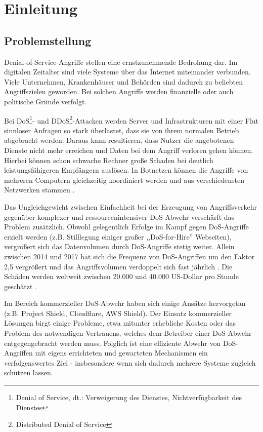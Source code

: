 \documentclass[../review_2.tex]{subfiles}
\begin{document}
    
    \chapter{Einleitung}\thispagestyle{fancy}
    
    \section{Problemstellung}
    Denial-of-Service-Angriffe stellen eine ernstzunehmende Bedrohung dar.
     Im digitalen Zeitalter sind viele Systeme über das Internet miteinander verbunden. Viele Unternehmen, Krankenhäuser und Behörden sind dadurch zu beliebten Angriffszielen geworden\cite{infopoint_security_cyber_angriffe}. Bei solchen Angriffe werden finanzielle oder auch politische Gründe verfolgt.
    
    Bei DoS\footnote{Denial of Service, dt.: Verweigerung des Dienstes, Nichtverfügbarkeit des Dienstes}- und DDoS\footnote{Distributed Denial of Service}-Attacken werden Server und Infrastrukturen mit einer Flut sinnloser Anfragen so stark überlastet, dass sie von ihrem normalen Betrieb abgebracht werden. Daraus kann resultieren, dass Nutzer die angebotenen Dienste nicht mehr erreichen und Daten bei dem Angriff verloren gehen können.
    Hierbei können schon schwache Rechner große Schaden bei deutlich leistungsfähigeren Empfängern auslösen. In Botnetzen können die Angriffe von mehreren Computern gleichzeitig koordiniert werden und aus verschiedensten Netzwerken stammen \cite{tecchannel_gefahr_botnet}.
    
    Das Ungleichgewicht zwischen Einfachheit bei der Erzeugung von Angriffsverkehr gegenüber komplexer und ressourcenintensiver DoS-Abwehr verschärft das Problem zusätzlich. Obwohl gelegentlich Erfolge im Kampf gegen DoS-Angriffe erzielt werden (z.B. Stilllegung einiger großer ,,DoS-for-Hire'' Webseiten), vergrößert sich das Datenvolumen durch DoS-Angriffe stetig weiter. Allein zwischen 2014 und 2017 hat sich die Frequenz von DoS-Angriffen um den Faktor 2,5 vergrößert und das Angriffsvolumen verdoppelt sich fast jährlich \cite{neustar_ddos_report}. Die Schäden werden weltweit zwischen 20.000 und 40.000 US-Dollar pro Stunde geschätzt \cite{datacenterknowledge_study}.
    
    Im Bereich kommerzieller DoS-Abwehr haben sich einige Ansätze hervorgetan (z.B. Project Shield\cite{projectshield}, Cloudflare\cite{cloudflare}, AWS Shield\cite{aws_shield}). Der Einsatz kommerzieller Lösungen birgt einige Probleme, etwa mitunter erhebliche Kosten oder das Problem des notwendigen Vertrauens, welches dem Betreiber einer DoS-Abwehr entgegengebracht werden muss. Folglich ist eine effiziente Abwehr von DoS-Angriffen mit eigens errichteten und gewarteten Mechanismen ein verfolgenswertes Ziel - insbesondere wenn sich dadurch mehrere Systeme zugleich schützen lassen.
    
\end{document}
